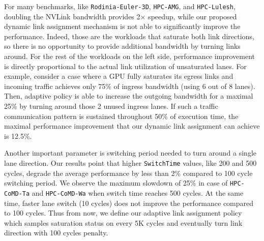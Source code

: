 For many benchmarks, like \texttt{Rodinia-Euler-3D}, \texttt{HPC-AMG}, and \texttt{HPC-Lulesh}, doubling the NVLink bandwidth provides 2$\times$ speedup, while our proposed dynamic link assignment mechanism is not able to significantly improve the performance. Indeed, those are the workloads that saturate both link directions, so there is no opportunity to provide additional bandwidth by turning links around. For the rest of the workloads on the left side, performance improvement is directly proportional to the actual link utilization of unsaturated lanes. For example, consider a case where a GPU fully saturates its egress links and incoming traffic achieves only 75\% of ingress bandwidth (using 6 out of 8 lanes). Then, adaptive policy is able to increase the outgoing bandwidth for a maximal 25\% by turning around those 2 unused ingress lanes. If such a traffic communication pattern is sustained throughout 50\% of execution time, the maximal performance improvement that our dynamic link assignment can achieve is 12.5\%.

Another important parameter is switching period needed to turn around a 
single lane direction. Our results point that higher \texttt{SwitchTime} 
values, like 200 and 500 cycles, degrade the average performance by less 
than 2\% compared to 100 cycle switching period. We observe the maximum 
slowdown of 25\% in case of \texttt{HPC-CoMD-Ta} and \texttt{HPC-CoMD-Wa} 
when switch time reaches 500 cycles. At the same time, faster lane switch (10 
cycles) does not improve the performance compared to 100 cycles. Thus from 
now, we define our adaptive link assignment policy which samples saturation 
status on every 5K cycles and eventually turn link direction with 100 cycles 
penalty. 



